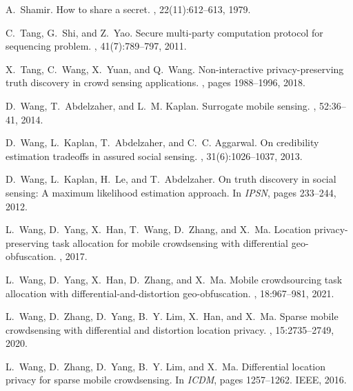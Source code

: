 \documentclass[11pt]{article}
\begin{document}
\begin{thebibliography}{10}
A.~Shamir.
\newblock How to share a secret.
, 22(11):612--613, 1979.

C.~Tang, G.~Shi, and Z.~Yao.
\newblock Secure multi-party computation protocol for sequencing problem.
, 41(7):789--797, 2011.

X.~Tang, C.~Wang, X.~Yuan, and Q.~Wang.
\newblock Non-interactive privacy-preserving truth discovery in crowd sensing
  applications.
, pages 1988--1996, 2018.

D.~Wang, T.~Abdelzaher, and L.~M. Kaplan.
\newblock Surrogate mobile sensing.
, 52:36--41, 2014.

D.~Wang, L.~Kaplan, T.~Abdelzaher, and C.~C. Aggarwal.
\newblock On credibility estimation tradeoffs in assured social sensing.
,
  31(6):1026--1037, 2013.

D.~Wang, L.~Kaplan, H.~Le, and T.~Abdelzaher.
\newblock On truth discovery in social sensing: A maximum likelihood estimation
  approach.
\newblock In {\em IPSN}, pages 233--244, 2012.

L.~Wang, D.~Yang, X.~Han, T.~Wang, D.~Zhang, and X.~Ma.
\newblock Location privacy-preserving task allocation for mobile crowdsensing
  with differential geo-obfuscation.
, 2017.

L.~Wang, D.~Yang, X.~Han, D.~Zhang, and X.~Ma.
\newblock Mobile crowdsourcing task allocation with differential-and-distortion
  geo-obfuscation.
,
  18:967--981, 2021.

L.~Wang, D.~Zhang, D.~Yang, B.~Y. Lim, X.~Han, and X.~Ma.
\newblock Sparse mobile crowdsensing with differential and distortion location
  privacy.
,
  15:2735--2749, 2020.

L.~Wang, D.~Zhang, D.~Yang, B.~Y. Lim, and X.~Ma.
\newblock Differential location privacy for sparse mobile crowdsensing.
\newblock In {\em ICDM}, pages 1257--1262. IEEE, 2016.


\end{thebibliography}
\end{document}
